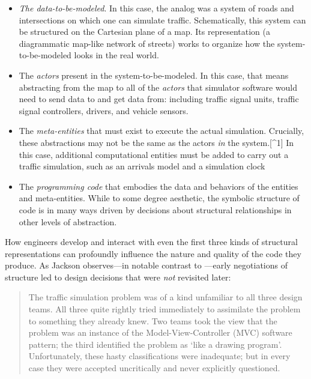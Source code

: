 \begin{itemize}
\tightlist
\item
  \emph{The data-to-be-modeled}. In this case, the analog was a system of roads and intersections on which one can simulate traffic. Schematically, this system can be structured on the Cartesian plane of a map. Its representation (a diagrammatic map-like network of streets) works to organize how the system-to-be-modeled looks in the real world.
\item
  The \emph{actors} present in the system-to-be-modeled. In this case, that means abstracting from the map to all of the \emph{actors} that simulator software would need to send data to and get data from: including traffic signal units, traffic signal controllers, drivers, and vehicle sensors.
\item
  The \emph{meta-entities} that must exist to execute the actual simulation. Crucially, these abstractions may not be the same as the actors \emph{in} the system.{[}\^{}1{]} In this case, additional computational entities must be added to carry out a traffic simulation, such as an arrivals model and a simulation clock \citep[ p.~559]{jackson_representing_2010}
\item
  The \emph{programming code} that embodies the data and behaviors of the entities and meta-entities. While to some degree aesthetic, the symbolic structure of code is in many ways driven by decisions about structural relationships in other levels of abstraction.
\end{itemize}

How engineers develop and interact with even the first three kinds of structural representations can profoundly influence the nature and quality of the code they produce. As Jackson \citeyearpar{jackson_representing_2010} observes---in notable contrast to \citep{baker_ideas_2010}---early negotiations of structure led to design decisions that were \emph{not} revisited later:

\begin{quote}
The traffic simulation problem was of a kind unfamiliar to all three design teams. All three quite rightly tried immediately to assimilate the problem to something they already knew. Two teams took the view that the problem was an instance of the Model-View-Controller (MVC) software pattern; the third identified the problem as `like a drawing program'. Unfortunately, these hasty classifications were inadequate; but in every case they were accepted uncritically and never explicitly questioned. \citep[ p.~564]{jackson_representing_2010}
\end{quote}

